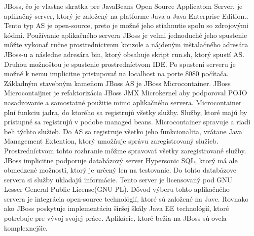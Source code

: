 JBoss, čo je vlastne skratka pre JavaBeans Open Source Applicatom Server, je aplikačný server, ktorý je založený na platforme Java a Java Enterprise Edition.\cite{jbossbook}. Tento typ AS je open-source, preto je možné jeho stiahnutie spolu so zdrojovými kódmi. Používanie aplikačného servera JBoss je veľmi jednoduché jeho spustenie môžte vykonať ručne prostredníctvom konzole a nájdeným inštalačného adresára JBoss-u a následne adresára bin, ktorý obsahuje skript run.sh, ktorý spustí AS. Druhou možnoštou je spustenie prostredníctvom IDE. Po spustení serveru je možné k nemu implicitne pristupovať na localhost na porte 8080 počítača. Základným stavebným kameňom JBoss AS je JBoss Microcontainer. JBoss Microcontaijner je refaktorizácia JBoss JMX Microkernel aby podporoval POJO nasadzovanie a samostatné použitie mimo aplikačného servera. Microcontainer plní funkciu jadra, do ktorého sa registrujú všetky služby. Služby, ktoré majú by prístupné sa registrujú v podobe managed beans. Microcontainer spravuje a riadi beh týchto služieb. Do AS sa registruje všetko jeho funkcionalita, vrátane Java Management Extention, ktorý umožňuje správu zaregistrovaný služieb. Prostredníctvom tohto rozhranie môžme spravovať všetky zaregistrované služby. JBoss implicitne podporuje databázový server Hypersonic SQL, ktorý má ale obmedzené možnosti, ktorý je určený len na testovanie. Do tohto databázove servera si služby ukladajú informácie.
Tento server je licensovaný pod GNU Lesser General Public License(GNU PL). Dôvod výberu tohto aplikačného servera je integrácia open-source technológií, ktoré sú založené na Jave. Rovnako ako JBoss poskytuje implementáciu širšej škály Java EE technológií, ktoré potrebuje pre vývoj svojej práce. Aplikácie, ktoré bežia na JBoss sú oveľa komplexnejšie.



